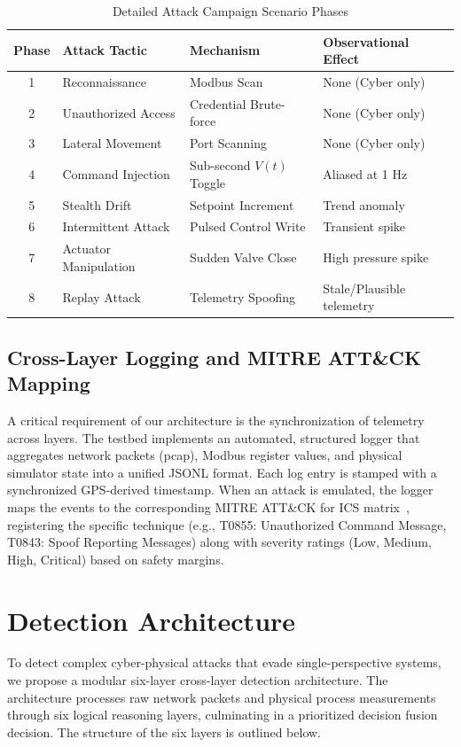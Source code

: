 \documentclass[journal,twoside,web]{ieeecolor}
\begin{document}
\begin{table}[!t]
\caption{Detailed Attack Campaign Scenario Phases}
\label{tab:attack_campaign_details}
\centering
\setlength{\tabcolsep}{5pt}
\begin{tabular}{clll}
\toprule
Phase & Attack Tactic & Mechanism & Observational Effect \\
\midrule
1 & Reconnaissance & Modbus Scan & None (Cyber only) \\
2 & Unauthorized Access & Credential Brute-force & None (Cyber only) \\
3 & Lateral Movement & Port Scanning & None (Cyber only) \\
4 & Command Injection & Sub-second $V(t)$ Toggle & Aliased at 1 Hz \\
5 & Stealth Drift & Setpoint Increment & Trend anomaly \\
6 & Intermittent Attack & Pulsed Control Write & Transient spike \\
7 & Actuator Manipulation & Sudden Valve Close & High pressure spike \\
8 & Replay Attack & Telemetry Spoofing & Stale/Plausible telemetry \\
\bottomrule
\end{tabular}
\end{table}

\subsection{Cross-Layer Logging and MITRE ATT\&CK Mapping}
A critical requirement of our architecture is the synchronization of telemetry across layers. The testbed implements an automated, structured logger that aggregates network packets (pcap), Modbus register values, and physical simulator state into a unified JSONL format. Each log entry is stamped with a synchronized GPS-derived timestamp. When an attack is emulated, the logger maps the events to the corresponding MITRE ATT\&CK for ICS matrix~\cite{mitre2021attack}, registering the specific technique (e.g., T0855: Unauthorized Command Message, T0843: Spoof Reporting Messages) along with severity ratings (Low, Medium, High, Critical) based on safety margins.

\section{Detection Architecture} \label{sec:detection_architecture}

To detect complex cyber-physical attacks that evade single-perspective systems, we propose a modular six-layer cross-layer detection architecture. The architecture processes raw network packets and physical process measurements through six logical reasoning layers, culminating in a prioritized decision fusion decision. The structure of the six layers is outlined below.
\end{document}
